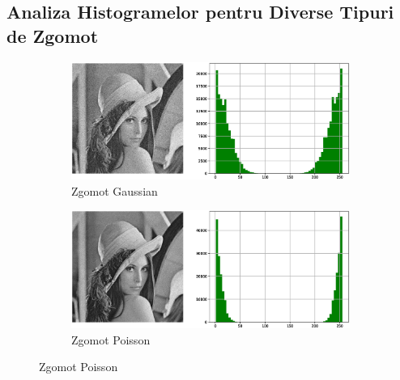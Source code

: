\documentclass[12pt]{article}
\begin{document}
\subsection{Analiza Histogramelor pentru Diverse Tipuri de Zgomot}

\begin{figure}[h!]
    \begin{subfigure}{0.49\textwidth}
        \centering
        \includegraphics[width=\textwidth]{images/Gaussian_plot.eps}
        \caption{Zgomot Gaussian}
        \label{fig:img4}
    \end{subfigure}
    \hspace{10pt} 
    \begin{subfigure}{0.49\textwidth}
        \centering
        \includegraphics[width=\textwidth]{images/Poisson_plot.eps}
        \caption{Zgomot Poisson}
        \label{fig:img5}
    \end{subfigure}
    \vspace{10pt} 


\end{figure}
\end{document}
